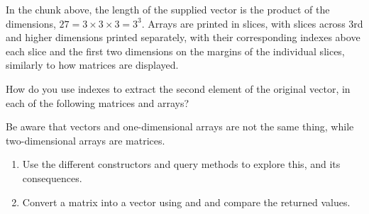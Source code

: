 \documentclass[krantz2]{krantz}\usepackage{knitr}
\begin{document}
In the chunk above, the length of the supplied vector is the product of the dimensions, $27 = 3 \times 3 \times 3 = 3^3$. Arrays are printed in slices, with slices across 3rd and higher dimensions printed separately, with their corresponding indexes above each slice and the first two dimensions on the margins of the individual slices, similarly to how matrices are displayed.

\begin{playground}
  How do you use indexes to extract the second element of the original vector, in each of the following matrices and arrays?

\begin{knitrout}\footnotesize
{}\color{fgcolor}\begin{kframe}
\begin{alltt}
 \hlkwb{<-} \hlopt{:}
 \hlkwb{<-}   \hlstd{=} \hlstd{)}
 \hlkwb{<-}   \hlstd{=} \hlstd{,}  \hlstd{=} \hlstd{)}
 \hlkwb{<-}   \hlstd{=} \hlstd{)}
 \hlkwb{<-}   \hlstd{=} \hlstd{,}  \hlstd{=} \hlstd{)}
\end{alltt}
\end{kframe}
\end{knitrout}

\begin{knitrout}\footnotesize
{}\color{fgcolor}\begin{kframe}
\begin{alltt}
 \hlkwb{<-} \hlopt{:}
 \hlkwb{<-}   \hlstd{=} \hlstd{(}\hlstd{,} \hlstd{))}
 \hlkwb{<-}   \hlstd{=} \hlstd{(}\hlstd{,} \hlstd{),}  \hlstd{=} \hlstd{(}\hlstd{,} \hlstd{(}\hlstd{,} \hlstd{)))}
 \hlkwb{<-}   \hlstd{=} \hlstd{(}\hlstd{,} \hlstd{))}
\end{alltt}
\end{kframe}
\end{knitrout}

Be aware that vectors and one-dimensional arrays are not the same thing, while two-dimensional arrays are matrices.
\begin{enumerate}
  \item Use the different constructors and query methods to explore this, and its consequences.
  \item Convert a matrix into a vector using  and  and compare the returned values.
\end{enumerate}
\end{playground}
\end{document}
